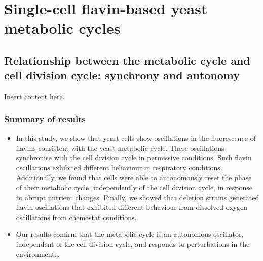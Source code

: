 \chapter{Single-cell flavin-based yeast metabolic cycles}

\section{Relationship between the metabolic cycle and cell division cycle: synchrony and autonomy}

Insert content here.

\subsection{Summary of results}
\label{sec:orgadeecf8}
\begin{itemize}
\item In this study, we show that yeast cells show oscillations in the fluorescence of flavins consistent with the yeast metabolic cycle.  These oscillations synchronise with the cell division cycle in permissive conditions.  Such flavin oscillations exhibited different behaviour in respiratory conditions.  Additionally, we found that cells were able to autonomously reset the phase of their metabolic cycle, independently of the cell division cycle, in response to abrupt nutrient changes.  Finally, we showed that deletion strains generated flavin oscillations that exhibited different behaviour from dissolved oxygen oscillations from chemostat conditions.
\item Our results confirm that the metabolic cycle is an autonomous oscillator, independent of the cell division cycle, and responds to perturbations in the environment\ldots{}
\end{itemize}
